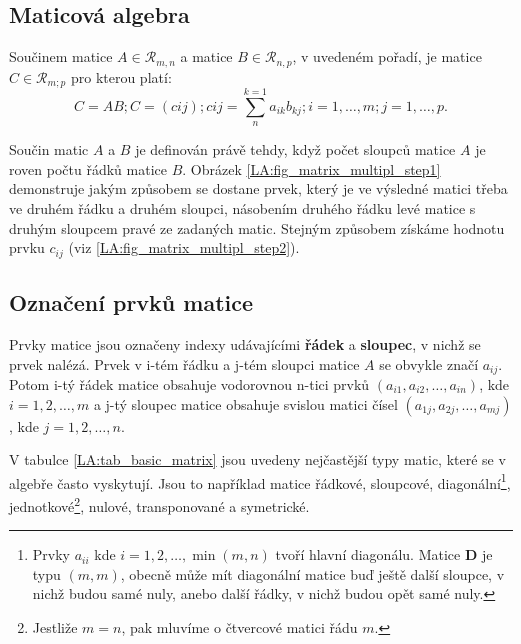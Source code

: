     \subsection{Maticová algebra}
      \begin{definition} 
        Součinem matice $A \in \mathcal{R}_{m,n}$ a matice $B \in \mathcal{R}_{n,p}$, v uvedeném
        pořadí, je matice $C \in \mathcal{R}_{m;p}$ pro kterou platí:
        \begin{equation}
           C = AB; C = (cij); cij = \sum_n^{k=1}{a_{ik}b_{kj}}; i = 1,\ldots,m; j = 1,\ldots,p.
        \end{equation} 
      \end{definition}  
      Součin matic $A$ a $B$ je definován právě tehdy, když počet sloupců matice $A$ je roven počtu 
      řádků matice $B$. Obrázek \ref{LA:fig_matrix_multipl_step1} demonstruje jakým způsobem se dostane 
      prvek, který je ve výsledné matici třeba ve druhém řádku a druhém sloupci, násobením druhého řádku levé 
      matice s druhým sloupcem pravé ze zadaných matic. Stejným způsobem získáme hodnotu prvku $c_{ij}$ (viz 
      \ref{LA:fig_matrix_multipl_step2}).
          
  
    \subsection{Označení prvků matice}
      Prvky matice jsou označeny indexy udávajícími \textbf{řádek} a \textbf{sloupec}, v nichž se prvek 
      nalézá. Prvek v i-tém řádku a j-tém sloupci matice $A$ se obvykle značí $a_{ij}$. Potom i-tý řádek 
      matice  obsahuje vodorovnou n-tici prvků $(a_{i1},a_{i2},\ldots,a_{in} )$, kde $i =  1,2,\ldots,m$ a 
      j-tý sloupec matice obsahuje svislou matici čísel $(a_{1j},a_{2j},\ldots,a_{mj})$, kde $j =       
      1,2,\ldots,n$.
  
      V tabulce \ref{LA:tab_basic_matrix} jsou uvedeny nejčastější typy matic, které se v algebře často 
      vyskytují. Jsou to například matice řádkové, sloupcové, diagonální\footnote{Prvky $a_{ii}$ kde 
      $i=1,2,\ldots,\min(m,n)$ tvoří hlavní diagonálu. Matice $\mathbf{D}$ je typu $(m,m)$, obecně může mít 
      diagonální matice buď ještě další sloupce, v nichž budou samé nuly, anebo další řádky, v nichž budou 
      opět samé nuly.}, jednotkové\footnote{ Jestliže $m = n$, pak mluvíme o čtvercové matici řádu $m$.}, 
      nulové, transponované a symetrické.
  

